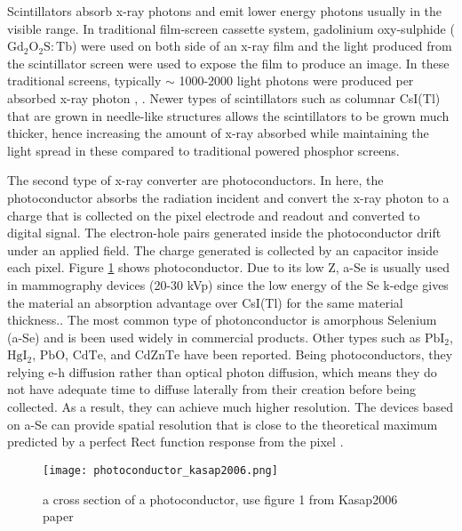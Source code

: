 Scintillators absorb x-ray photons and emit lower energy photons usually in the visible range.  In traditional film-screen cassette system, gadolinium oxy-sulphide ($\mathrm{Gd_2O_2S:Tb}$) were used on both side of an x-ray film and the light produced from the scintillator screen were used to expose the film to produce an image.  In these traditional screens, typically $\sim$ 1000-2000 light photons were produced per absorbed x-ray photon \cite{trauernicht1988}, \cite{trauernicht1990}. Newer types of scintillators such as columnar CsI(Tl) that are grown in needle-like structures allows the scintillators to be grown much thicker, hence increasing the amount of x-ray absorbed while maintaining the light spread in these compared to traditional powered phosphor screens.

The second type of x-ray converter are photoconductors.  In here,  the photoconductor absorbs the radiation incident and convert the x-ray photon to a charge that is collected on the pixel electrode and readout and converted to digital signal.  The electron-hole pairs generated inside the photoconductor drift under an applied field.  The charge generated is collected by an capacitor inside each pixel. Figure \ref{fig:photoconductor_cross_section} shows photoconductor.  Due to its low Z, a-Se is usually used in mammography devices (20-30 kVp) since the low energy of the Se k-edge gives the material an absorption advantage over CsI(Tl) for the same material thickness.\cite{Yorkston2007}.  The most common type of photonconductor is amorphous Selenium (a-Se) and is been used widely in commercial products.  Other types such as $\mathrm{PbI_2}$, $\mathrm{HgI_2}$, $\mathrm{PbO}$, $\mathrm{CdTe}$, and $\mathrm{CdZnTe}$ have been reported.  Being photoconductors, they relying e-h diffusion rather than optical photon diffusion, which means they do not have adequate time to diffuse laterally from their creation before being collected.  As a result, they can achieve much higher resolution.  The devices based on a-Se can provide spatial resolution that is close to the theoretical maximum predicted by a perfect Rect function response from the pixel \cite{hunt5030}. 

\begin{figure}
\centering
\texttt{[image: photoconductor\_kasap2006.png]}
\caption{a cross section of a photoconductor, use figure 1 from Kasap2006 paper}
\label{fig:photoconductor_cross_section}
\end{figure} 

